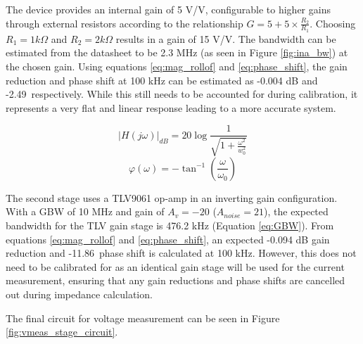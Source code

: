 The device provides an internal gain of 5 V/V, configurable to higher gains through external resistors according to the relationship $G = 5 + 5\times \frac{R_2}{R_1}$. Choosing $R_1=1 k\Omega$ and $R_2=2 k\Omega$ results in a gain of 15 V/V. The bandwidth can be estimated from the datasheet to be 2.3 MHz (as seen in Figure \ref{fig:ina_bw}) at the chosen gain. Using equations \ref{eq:mag_rollof} and \ref{eq:phase_shift}, the gain reduction and phase shift at 100 kHz can be estimated as -0.004 dB and -2.49\textdegree\ respectively. While this still needs to be accounted for during calibration, it represents a very flat and linear response leading to a more accurate system.


\begin{equation}
    |H(j\omega)|_{dB} = 20\log\frac{1}{\sqrt{1+\frac{\omega^2}{w_0^2}}}
    \label{eq:mag_rollof}
\end{equation}
\begin{equation}
    \varphi(\omega) = -\tan^{-1}(\frac{\omega}{\omega_0})
    \label{eq:phase_shift}
\end{equation}


The second stage uses a TLV9061 op-amp in an inverting gain configuration.  With a GBW of 10 MHz and gain of $A_v=-20$ ($A_{noise}=21$), the expected bandwidth for the TLV gain stage is 476.2 kHz (Equation \ref{eq:GBW}). From equations \ref{eq:mag_rollof} and \ref{eq:phase_shift}, an expected -0.094 dB gain reduction and -11.86\textdegree\ phase shift is calculated at 100 kHz. However, this does not need to be calibrated for as an identical gain stage will be used for the current measurement, ensuring that any gain reductions and phase shifts are cancelled out during impedance calculation.

The final circuit for voltage measurement can be seen in Figure \ref{fig:vmeas_stage_circuit}.

